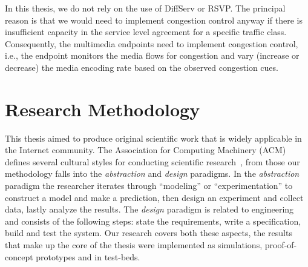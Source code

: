 





In this thesis, we do not rely on the use of DiffServ or RSVP. The principal
reason is that we would need to implement congestion control anyway if there
is insufficient capacity in the service level agreement for a specific traffic
class. Consequently, the multimedia endpoints need to implement congestion
control, i.e., the endpoint monitors the media flows for congestion and vary
(increase or decrease) the media encoding rate based on the observed
congestion cues.



\section{Research Methodology}

This thesis aimed to produce original scientific work that is widely
applicable in the Internet community. The Association for Computing Machinery
(ACM) defines several cultural styles for conducting scientific
research~\cite{Denning:CS.Method}, from those our methodology falls into the
\textit{abstraction} and \textit{design} paradigms. In the \emph{abstraction}
paradigm the researcher iterates through ``modeling'' or ``experimentation''
to construct a model and make a prediction, then design an experiment and
collect data, lastly analyze the results. The \emph{design} paradigm is
related to  engineering and consists of the following steps: state the
requirements, write a specification, build and test the system. Our research
covers both these aspects, the results that make up the core of the thesis
were implemented as simulations, proof-of-concept prototypes and in test-beds. 

